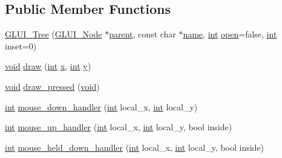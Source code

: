 \subsection*{Public Member Functions}
\begin{DoxyCompactItemize}
\item 
\hyperlink{class_g_l_u_i___tree_a2c31d1ac60654e1ee8b818c80bbb965a}{G\+L\+U\+I\+\_\+\+Tree} (\hyperlink{class_g_l_u_i___node}{G\+L\+U\+I\+\_\+\+Node} $\ast$\hyperlink{class_g_l_u_i___node_a8ed65d447784f6f88bd3e2e2bcac6cdb}{parent}, const char $\ast$\hyperlink{glext_8h_ad977737dfc9a274a62741b9500c49a32}{name}, \hyperlink{wglext_8h_a500a82aecba06f4550f6849b8099ca21}{int} \hyperlink{class_g_l_u_i___tree_a9dcfded5ecce182b218e12e207d0a0c4}{open}=false, \hyperlink{wglext_8h_a500a82aecba06f4550f6849b8099ca21}{int} inset=0)
\item 
\hyperlink{wglext_8h_a9e6b7f1933461ef318bb000d6bd13b83}{void} \hyperlink{class_g_l_u_i___tree_a95b179b8d413fc280ef58cb62f9defb2}{draw} (\hyperlink{wglext_8h_a500a82aecba06f4550f6849b8099ca21}{int} \hyperlink{glext_8h_ad77deca22f617d3f0e0eb786445689fc}{x}, \hyperlink{wglext_8h_a500a82aecba06f4550f6849b8099ca21}{int} \hyperlink{glext_8h_a9298c7ad619074f5285b32c6b72bfdea}{y})
\item 
\hyperlink{wglext_8h_a9e6b7f1933461ef318bb000d6bd13b83}{void} \hyperlink{class_g_l_u_i___tree_a1360117342c313ed0c1cdd879f4550f5}{draw\+\_\+pressed} (\hyperlink{wglext_8h_a9e6b7f1933461ef318bb000d6bd13b83}{void})
\item 
\hyperlink{wglext_8h_a500a82aecba06f4550f6849b8099ca21}{int} \hyperlink{class_g_l_u_i___tree_a0b127300ac1c19eb94122c4255ab2834}{mouse\+\_\+down\+\_\+handler} (\hyperlink{wglext_8h_a500a82aecba06f4550f6849b8099ca21}{int} local\+\_\+x, \hyperlink{wglext_8h_a500a82aecba06f4550f6849b8099ca21}{int} local\+\_\+y)
\item 
\hyperlink{wglext_8h_a500a82aecba06f4550f6849b8099ca21}{int} \hyperlink{class_g_l_u_i___tree_afadc8d29f7aaf67b907009e80f7b861e}{mouse\+\_\+up\+\_\+handler} (\hyperlink{wglext_8h_a500a82aecba06f4550f6849b8099ca21}{int} local\+\_\+x, \hyperlink{wglext_8h_a500a82aecba06f4550f6849b8099ca21}{int} local\+\_\+y, bool inside)
\item 
\hyperlink{wglext_8h_a500a82aecba06f4550f6849b8099ca21}{int} \hyperlink{class_g_l_u_i___tree_aef3c1c1a7854845d9cdd338907e46485}{mouse\+\_\+held\+\_\+down\+\_\+handler} (\hyperlink{wglext_8h_a500a82aecba06f4550f6849b8099ca21}{int} local\+\_\+x, \hyperlink{wglext_8h_a500a82aecba06f4550f6849b8099ca21}{int} local\+\_\+y, bool inside)

\end{DoxyCompactItemize}
